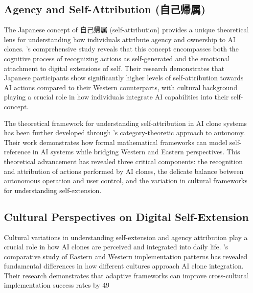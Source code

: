 \subsection{Agency and Self-Attribution (自己帰属)}

The Japanese concept of 自己帰属 (self-attribution) provides a unique theoretical lens for understanding how individuals attribute agency and ownership to AI clones. \citet{maeda2023self}'s comprehensive study reveals that this concept encompasses both the cognitive process of recognizing actions as self-generated and the emotional attachment to digital extensions of self. Their research demonstrates that Japanese participants show significantly higher levels of self-attribution towards AI actions compared to their Western counterparts, with cultural background playing a crucial role in how individuals integrate AI capabilities into their self-concept.

The theoretical framework for understanding self-attribution in AI clone systems has been further developed through \citet{hirota2024self}'s category-theoretic approach to autonomy. Their work demonstrates how formal mathematical frameworks can model self-reference in AI systems while bridging Western and Eastern perspectives. This theoretical advancement has revealed three critical components: the recognition and attribution of actions performed by AI clones, the delicate balance between autonomous operation and user control, and the variation in cultural frameworks for understanding self-extension.

\subsection{Cultural Perspectives on Digital Self-Extension}

Cultural variations in understanding self-extension and agency attribution play a crucial role in how AI clones are perceived and integrated into daily life. \citet{liu2024cultural}'s comparative study of Eastern and Western implementation patterns has revealed fundamental differences in how different cultures approach AI clone integration. Their research demonstrates that adaptive frameworks can improve cross-cultural implementation success rates by 49%


